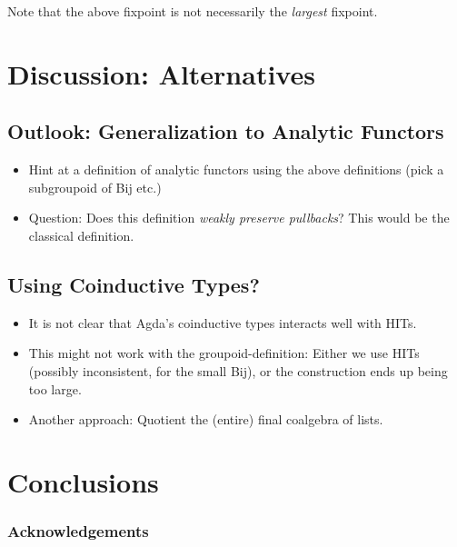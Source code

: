 \documentclass[runningheads]{llncs}
\begin{document}
Note that the above fixpoint is not necessarily the \emph{largest} fixpoint.

\section{Discussion: Alternatives}
\subsection{Outlook: Generalization to Analytic Functors}

\begin{itemize}
    \item Hint at a definition of analytic functors using
        the above definitions (pick a subgroupoid of Bij etc.)
    \item Question:
        Does this definition \emph{weakly preserve pullbacks}?
        This would be the classical definition.
\end{itemize}

\subsection{Using Coinductive Types?}

\begin{itemize}
    \item It is not clear that Agda's coinductive types
        interacts well with HITs.
    \item This might not work with the groupoid-definition:
        Either we use HITs (possibly inconsistent, for the small Bij),
        or the construction ends up being too large.
    \item
        Another approach: Quotient the (entire) final coalgebra of lists.
\end{itemize}

\section{Conclusions}

\subsubsection{Acknowledgements}

\nocite{*}



\end{document}
